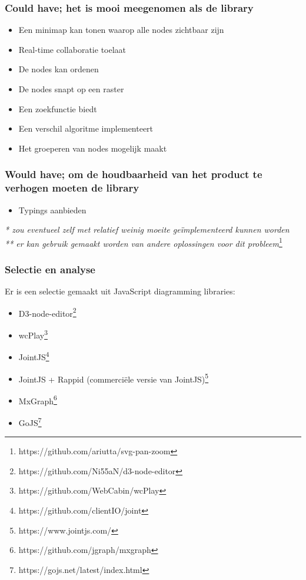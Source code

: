 \subsubsection{Could have; het is mooi meegenomen als de library}
\begin{itemize}
    \item Een minimap kan tonen waarop alle nodes zichtbaar zijn
    \item Real-time collaboratie toelaat
    \item De nodes kan ordenen
    \item De nodes snapt op een raster
    \item Een zoekfunctie biedt
    \item Een verschil algoritme implementeert
    \item Het groeperen van nodes mogelijk maakt
\end{itemize}

\subsubsection{Would have; om de houdbaarheid van het product te verhogen moeten de library}
\begin{itemize}
    \item Typings aanbieden
\end{itemize}

\noindent \textit{* zou eventueel zelf met relatief weinig moeite geïmplementeerd kunnen worden}\\
\textit{** er kan gebruik gemaakt worden van andere oplossingen voor dit probleem}\footnote{https://github.com/ariutta/svg-pan-zoom}

\subsubsection{Selectie en analyse}
Er is een selectie gemaakt uit JavaScript diagramming libraries:
\begin{itemize}
    \item D3-node-editor\footnote{https://github.com/Ni55aN/d3-node-editor}
    \item wcPlay\footnote{https://github.com/WebCabin/wcPlay}
    \item JointJS\footnote{ https://github.com/clientIO/joint}
    \item JointJS + Rappid (commerciële versie van JointJS)\footnote{https://www.jointjs.com/}
    \item MxGraph\footnote{https://github.com/jgraph/mxgraph}
    \item GoJS\footnote{https://gojs.net/latest/index.html}
\end{itemize}


